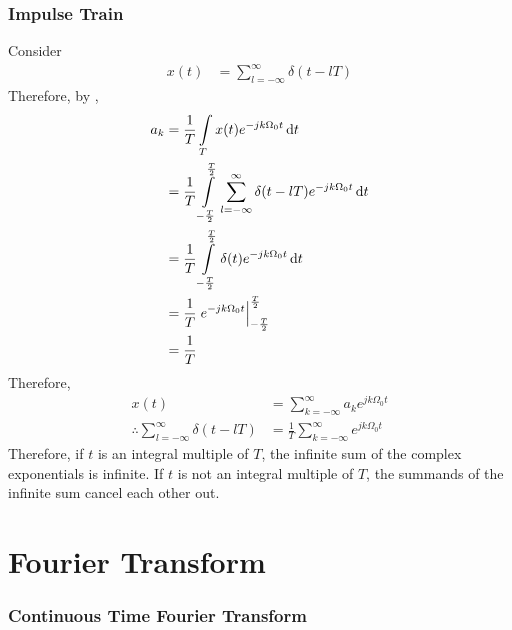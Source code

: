 \documentclass[titlepage, fleqn, a4paper, 12pt, twoside]{article}
\theoremstyle{definition}
\theoremstyle{theorem}
\begin{document}
\section{Impulse Train}

Consider
\begin{align*}
	x(t) &= \sum\limits_{l = -\infty}^{\infty} \delta(t - l T)
\end{align*}
Therefore, by ,
\begin{align*}
	a_k &= \frac{1}{T} \int\limits_{T} x(t) e^{-j k \Omega_0 t} \dif t\\
	&= \frac{1}{T} \int\limits_{-\frac{T}{2}}^{\frac{T}{2}} \sum\limits_{l = -\infty}^{\infty} \delta(t - l T) e^{-j k \Omega_0 t} \dif t\\
	&= \frac{1}{T} \int\limits_{-\frac{T}{2}}^{\frac{T}{2}} \delta(t) e^{-j k \Omega_0 t} \dif t\\
	&= \frac{1}{T} \left. e^{-j k \Omega_0 t} \right|_{-\frac{T}{2}}^{\frac{T}{2}}\\
	&= \frac{1}{T}
\end{align*}
Therefore,
\begin{align*}
	x(t) &= \sum\limits_{k = -\infty}^{\infty} a_k e^{j k \Omega_0 t}\\
	\therefore \sum\limits_{l = -\infty}^{\infty} \delta(t - l T) &= \frac{1}{T} \sum\limits_{k = -\infty}^{\infty} e^{j k \Omega_0 t}
\end{align*}
Therefore, if $t$ is an integral multiple of $T$, the infinite sum of the complex exponentials is infinite.
If $t$ is not an integral multiple of $T$, the summands of the infinite sum cancel each other out.

\clearpage
\part{Fourier Transform}

\section{Continuous Time Fourier Transform}
\end{document}
